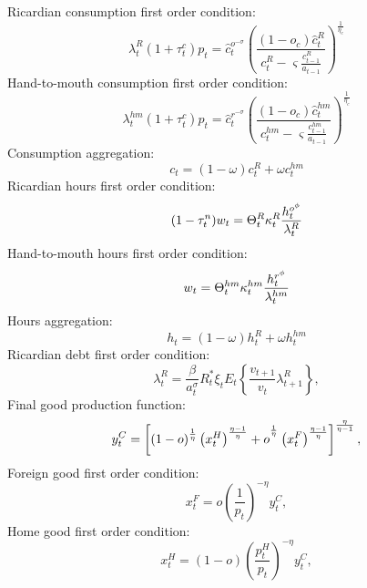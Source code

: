 \documentclass[12pt]{article}
\begin{document}
\noindent Ricardian consumption first order condition:
\begin{equation}
\lambda _{t}^R(1+\tau_t^c)p_t=\hat{c}_t^{o^{-\sigma}}\left(\frac{(1-o_c)\hat{c}^R_t}{c_t^R - \varsigma\frac{c_{t-1}^R}{a_{t-1}} }\right)^{\frac{1}{\eta_c}} \label{eq:EE_1}
\end{equation}%
Hand-to-mouth consumption first order condition:
\begin{equation}
\lambda _{t}^{hm}(1+\tau_t^c)p_t=\hat{c}_t^{r^{-\sigma}}\left(\frac{(1-o_c)\hat{c}^{hm}_t}{c_t^{hm} - \varsigma\frac{c_{t-1}^{hm}}{a_{t-1}} }\right)^{\frac{1}{\eta_c}} \label{eq:EE_2}
\end{equation}%
Consumption aggregation:
\begin{equation}
c_t = (1-\omega)c_t^R + \omega c_t^{hm}
\label{eq:EE_3}
\end{equation}
Ricardian hours first order condition:
\begin{equation}
(1-\tau_t^n)w_{t}=\Theta _{t}^R\kappa^R _{t}\frac{h_{t}^{o^\phi }}{%
\lambda^R _{t}}  \label{eq:EE_4}
\end{equation}%
Hand-to-mouth hours first order condition:
\begin{equation}
w_{t}=\Theta _{t}^{hm}\kappa^{hm} _{t}\frac{h_{t}^{r^\phi }}{%
\lambda^{hm} _{t}}  \label{eq:EE_5}
\end{equation}%
Hours aggregation:
\begin{equation}
h_t = (1-\omega)h_t^R + \omega h_t^{hm} \label{eq:EE_6}
\end{equation}
Ricardian debt first order condition:
\begin{equation}
\lambda^R _{t}=\frac{\beta }{a_{t}^{\sigma }}R_{t}^{\ast }\xi _{t}E_{t}\left\{
\frac{v_{t+1}}{v_{t}}\lambda^R _{t+1}\right\}
,  \label{eq:EE_7}
\end{equation}%
Final good production function:
\begin{equation}
y_{t}^{C}=\left[ \left( 1-o\right) ^{\frac{1}{\eta }}\left( x_{t}^{H}\right)
^{\frac{\eta -1}{\eta }}+o^{^{\frac{1}{\eta }}}\left( x_{t}^{F}\right) ^{%
\frac{\eta -1}{\eta }}\right] ^{\frac{\eta }{\eta -1}},  \label{eq:EE_8}
\end{equation}%
Foreign good first order condition:
\begin{equation}
x_{t}^{F}=o\left(\frac{1}{p_t}\right) ^{-\eta }y_{t}^{C},  \label{eq:EE_9}
\end{equation}%
Home good first order condition:
\begin{equation}
x_{t}^{H}=\left( 1-o\right) \left(\frac{p_{t}^{H}}{p_{t}}\right) ^{-\eta }y_{t}^{C},
\label{eq:EE_10}
\end{equation}%
\end{document}
